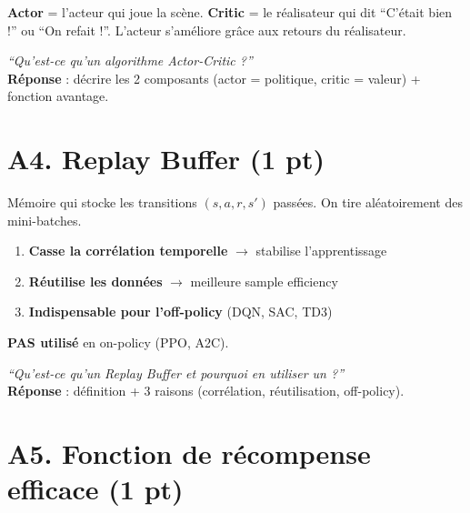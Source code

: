 \documentclass[11pt,a4paper]{article}
\begin{document}
\begin{exbox}
\textbf{Actor} = l'acteur qui joue la scène. \textbf{Critic} = le réalisateur qui dit ``C'était bien !'' ou ``On refait !''. L'acteur s'améliore grâce aux retours du réalisateur.
\end{exbox}

\begin{exambox}
\textit{``Qu'est-ce qu'un algorithme Actor-Critic ?''}\\[4pt]
\textbf{Réponse} : décrire les 2 composants (actor = politique, critic = valeur) + fonction avantage.
\end{exambox}

\section{A4. Replay Buffer (1 pt)}

\begin{formbox}
Mémoire qui stocke les transitions $(s, a, r, s')$ passées. On tire aléatoirement des mini-batches.
\begin{enumerate}[nosep]
\item \textbf{Casse la corrélation temporelle} $\to$ stabilise l'apprentissage
\item \textbf{Réutilise les données} $\to$ meilleure sample efficiency
\item \textbf{Indispensable pour l'off-policy} (DQN, SAC, TD3)
\end{enumerate}
\textbf{PAS utilisé} en on-policy (PPO, A2C).
\end{formbox}

\begin{exambox}
\textit{``Qu'est-ce qu'un Replay Buffer et pourquoi en utiliser un ?''}\\[4pt]
\textbf{Réponse} : définition + 3 raisons (corrélation, réutilisation, off-policy).
\end{exambox}

\section{A5. Fonction de récompense efficace (1 pt)}
\end{document}
